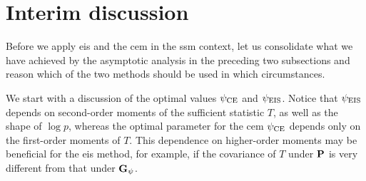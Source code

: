 \section{Interim discussion}

Before we apply \acrshort{eis} and the \acrshort{cem} in the \acrshort{ssm} context, let us consolidate what we have achieved by the asymptotic analysis in the preceding two subsections and reason which of the two methods should be used in which circumstances.

We start with a discussion of the optimal values $\pce$ and $\peis$.
Notice that $\peis$ depends on second-order moments of the sufficient statistic $T$, as well as the shape of $\log p$, whereas the optimal parameter for the \gls{cem} $\pce$ depends only on the first-order moments of $T$. 
This dependence on higher-order moments may be beneficial for the \acrshort{eis} method, for example, if the covariance of $T$ under $\P$ is very different from that under $\G_{\psi}$. 




